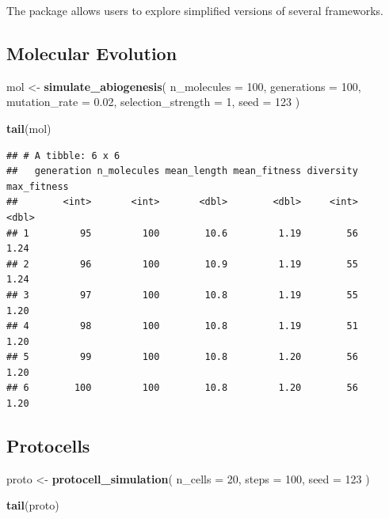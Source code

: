 \documentclass[
  oneside,
  openany]{book}
\newenvironment{Shaded}{\begin{snugshade}}{\end{snugshade}}
\newcommand{\AttributeTok}[1]{\textcolor[rgb]{0.13,0.29,0.53}{#1}}
\newcommand{\DecValTok}[1]{\textcolor[rgb]{0.00,0.00,0.81}{#1}}
\newcommand{\FloatTok}[1]{\textcolor[rgb]{0.00,0.00,0.81}{#1}}
\newcommand{\FunctionTok}[1]{\textcolor[rgb]{0.13,0.29,0.53}{\textbf{#1}}}
\newcommand{\NormalTok}[1]{#1}
\newcommand{\OtherTok}[1]{\textcolor[rgb]{0.56,0.35,0.01}{#1}}
\begin{document}
The package allows users to explore simplified versions of several frameworks.

\subsection{Molecular Evolution}\label{molecular-evolution-1}

\begin{Shaded}
\begin{Highlighting}[]
\NormalTok{mol }\OtherTok{\textless{}{-}} \FunctionTok{simulate\_abiogenesis}\NormalTok{(}
  \AttributeTok{n\_molecules =} \DecValTok{100}\NormalTok{,}
  \AttributeTok{generations =} \DecValTok{100}\NormalTok{,}
  \AttributeTok{mutation\_rate =} \FloatTok{0.02}\NormalTok{,}
  \AttributeTok{selection\_strength =} \DecValTok{1}\NormalTok{,}
  \AttributeTok{seed =} \DecValTok{123}
\NormalTok{)}

\FunctionTok{tail}\NormalTok{(mol)}
\end{Highlighting}
\end{Shaded}

\begin{verbatim}
## # A tibble: 6 x 6
##   generation n_molecules mean_length mean_fitness diversity max_fitness
##        <int>       <int>       <dbl>        <dbl>     <int>       <dbl>
## 1         95         100        10.6         1.19        56        1.24
## 2         96         100        10.9         1.19        55        1.24
## 3         97         100        10.8         1.19        55        1.20
## 4         98         100        10.8         1.19        51        1.20
## 5         99         100        10.8         1.20        56        1.20
## 6        100         100        10.8         1.20        56        1.20
\end{verbatim}

\subsection{Protocells}\label{protocells}

\begin{Shaded}
\begin{Highlighting}[]
\NormalTok{proto }\OtherTok{\textless{}{-}} \FunctionTok{protocell\_simulation}\NormalTok{(}
  \AttributeTok{n\_cells =} \DecValTok{20}\NormalTok{,}
  \AttributeTok{steps =} \DecValTok{100}\NormalTok{,}
  \AttributeTok{seed =} \DecValTok{123}
\NormalTok{)}

\FunctionTok{tail}\NormalTok{(proto)}
\end{Highlighting}
\end{Shaded}
\end{document}
